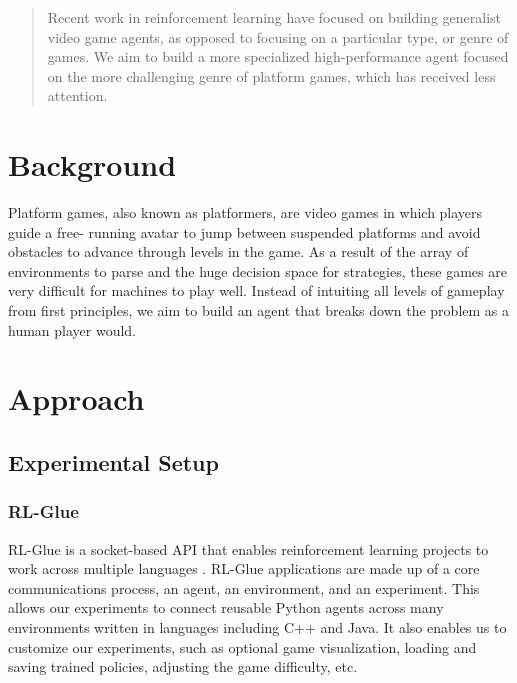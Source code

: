 \documentclass{article}
\begin{document}
 


\begin{abstract} 
Recent work in reinforcement learning have focused on building generalist video game agents, as opposed to focusing on a particular type, or genre of games. We aim to build a more specialized high-performance agent focused on the more challenging genre of platform games, which has received less attention.
\end{abstract} 



\section{Background}
Platform games, also known as platformers, are video games in which players guide a free- running avatar to jump between suspended platforms and avoid obstacles to advance through levels in the game. As a result of the array of environments to parse and the huge decision space for strategies, these games are very difficult for machines to play well. Instead of intuiting all levels of gameplay from first principles, we aim to build an agent that breaks down the problem as a human player would.


\section{Approach}

\subsection{Experimental Setup}

\subsubsection{RL-Glue}
RL-Glue is a socket-based API that enables reinforcement learning projects to work across multiple languages \cite{Tanner09}. RL-Glue applications are made up of a core communications process, an agent, an environment, and an experiment. This allows our experiments to connect reusable Python agents across many environments written in languages including C++ and Java. It also enables us to customize our experiments, such as optional game visualization, loading and saving trained policies, adjusting the game difficulty, etc.
\end{document}
